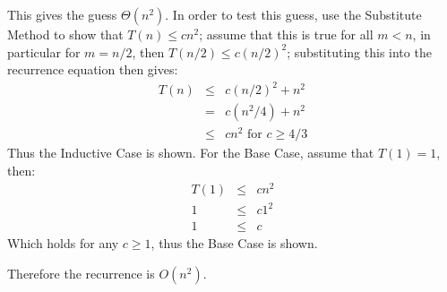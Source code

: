 \documentclass{article}
\begin{document}
This gives the guess $\Theta(n^2)$.  In order to test this guess, use the Substitute Method to show that $T(n) \leq cn^2$; assume that this is true for all $m < n$, in particular for $m = n/2$, then $T(n/2) \leq c(n/2)^2$; substituting this into the recurrence equation then gives:
\begin{eqnarray*}
	T(n) &\leq& c(n/2)^2 + n^2 \\
	 &=& c(n^2/4) + n^2 \\
	 &\leq& cn^2 \mbox{ for $c \geq 4/3$}
\end{eqnarray*}
Thus the Inductive Case is shown.  For the Base Case, assume that $T(1) = 1$, then:
\begin{eqnarray*}
	T(1) &\leq& cn^2 \\
	1 &\leq& c1^2 \\
	1 &\leq& c
\end{eqnarray*}
Which holds for any $c \geq 1$, thus the Base Case is shown.

Therefore the recurrence is $O(n^2)$.
\end{document}

